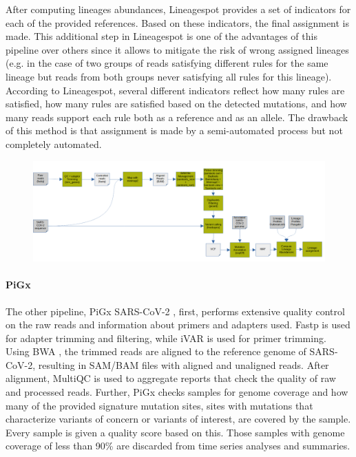         After computing lineages abundances, Lineagespot provides a set of indicators for each of the provided references. Based on these indicators, the final assignment is made. This additional step in Lineagespot is one of the advantages of this pipeline over others since it allows to mitigate the risk of wrong assigned lineages (e.g. in the case of two groups of reads satisfying different rules for the same lineage but reads from both groups never satisfying all rules for this lineage). According to Lineagespot, several different indicators reflect how many rules are satisfied, how many rules are satisfied based on the detected mutations, and how many reads support each rule both as a reference and as an allele. The drawback of this method is that assignment is made by a semi-automated process but not completely automated.
        \begin{landscape}
        \centering\vspace*{\fill}
        \begin{center}
        \begin{figure}[H]
        	\centering
            \includegraphics[width=1.4\textwidth]{figures/prior/lineagespot.png}
            \label{fig:prior:ls}
        \end{figure}
        \end{center}
        \vfill
        \end{landscape}
        
        \paragraph{PiGx}
        The other pipeline, PiGx SARS-CoV-2 \cite{schumann2021}, first, performs extensive quality control on the raw reads and information about primers and adapters used. Fastp \cite{chen2018} is used for adapter trimming and filtering, while iVAR is used for primer trimming. Using BWA \cite{li2013}, the trimmed reads are aligned to the reference genome of SARS-CoV-2, resulting in SAM/BAM files with aligned and unaligned reads. After alignment, MultiQC \cite{multiqc} is used to aggregate reports that check the quality of raw and processed reads. Further, PiGx checks samples for genome coverage and how many of the provided signature mutation sites, sites with mutations that characterize variants of concern or variants of interest, are covered by the sample. Every sample is given a quality score based on this. Those samples with genome coverage of less than 90\% are discarded from time series analyses and summaries.

